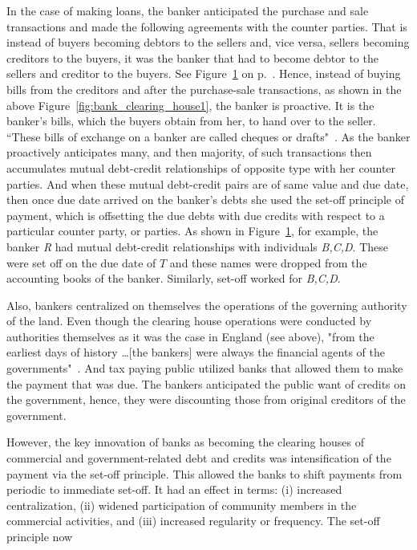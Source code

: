 \begin{figure}[!ht]
\label{fig:bank_clearing_house2}
\vspace{.2in}
\end{figure}

In the case of making loans, the banker anticipated the purchase and sale transactions and made the following agreements with the counter parties. That is instead of buyers becoming debtors to the sellers and, vice versa, sellers becoming creditors to the buyers, it was the banker that had to become debtor to the sellers and creditor to the buyers. See Figure~\ref{fig:bank_clearing_house2} on p.~\pageref{fig:bank_clearing_house2}. Hence, instead of buying bills from the creditors and after the purchase-sale transactions, as shown in the above Figure~\ref{fig:bank_clearing_house1}, the banker is proactive. It is the banker's bills, which the buyers obtain from her, to hand over to the seller. ``These bills of
exchange on a banker are called cheques or drafts"~\citep[p.~403]{innes1913}. As the banker proactively anticipates many, and then majority, of such transactions then accumulates mutual debt-credit relationships of opposite type with her counter parties. And when these mutual debt-credit pairs are of same value and due date, then once due date arrived on the banker's debts she used the set-off principle of payment, which is offsetting the due debts with due credits with respect to a particular counter party, or parties. As shown in Figure~\ref{fig:bank_clearing_house2}, for example, the banker \textit{R} had mutual debt-credit relationships with individuals \textit{B,C,D}. These were set off on the due date of $T$ and these names were dropped from the accounting books of the banker. Similarly, set-off worked for \textit{B,C,D}.
  
Also, bankers centralized on themselves the operations of the governing authority of the land.  Even though the clearing house operations were conducted by authorities themselves as it was the case in England (see above), "from the earliest days of history \dots [the bankers] were always the financial agents of the governments"~\citep[p.~399]{innes1913}. And tax paying public utilized banks that allowed them to make the payment that was due. The bankers anticipated the public want of credits on the government, hence, they were discounting those from original creditors of the government.

However, the key innovation of banks as becoming the clearing houses of commercial and government-related debt and credits was intensification of the payment via the set-off principle. This allowed the banks to shift payments from periodic to immediate set-off. It had an effect in terms: (i) increased centralization, (ii) widened participation of community members in the commercial activities, and (iii) increased regularity or frequency. The set-off principle now  


